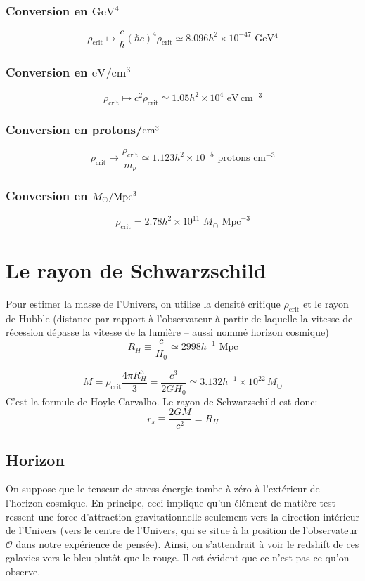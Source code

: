 \documentclass{article}
\numberwithin{equation}{section}
\begin{document}
\subsubsection{Conversion en $\si{\giga \electronvolt^{4}}$}
\[
        \rho_{\text{crit}} \mapsto \frac{c}{\hbar} (\hbar c)^4 \rho_{\text{crit}}
        \simeq 8.096 h^2 \times 10^{-47}\,\, \si{\giga\electronvolt^{4}}
\]

\subsubsection{Conversion en $\si{\electronvolt \per \centi\meter^{3}}$}
\[
        \rho_{\text{crit}} \mapsto c^2 \rho_{\text{crit}} \simeq 1.05 h^2 \times 10^{4}\,\, 
        \si{\electronvolt}\, \text{cm}^{-3}
\]

\subsubsection{Conversion en \textmd{protons}/$\textmd{cm}^{3}$}
\[
        \rho_{\text{crit}} \mapsto \frac{\rho_{\text{crit}}}{m_p} \simeq 
        1.123h^2\times 10^{-5}\,\, \text{protons}\,\,\text{cm}^{-3}
\]

\subsubsection{Conversion en $M_\odot / \textmd{Mpc}^{3}$}
\[
        \rho_{\text{crit}} = 2.78h^2 \times 10^{11}\,\, M_\odot\,\, \text{Mpc}^{-3}
\]


\section{Le rayon de Schwarzschild}
Pour estimer la masse de l'Univers, on utilise la densité critique $\rho_{\text{crit}}$ 
et le rayon de Hubble (distance par rapport à l'observateur à partir de laquelle 
la vitesse de récession dépasse la vitesse de la lumière -- aussi nommé horizon cosmique)
\[
        R_H \equiv \frac{c}{H_0} \simeq 2998h^{-1}\,\, \text{Mpc}
\]

\[
        M =  \rho_{\text{crit}} \frac{4 \pi R_H^{3}}{3} = \frac{c^3}{2GH_0} 
       \simeq 3.132  h^{-1} \times 10^{22}\, M_\odot
\]
C'est la formule de Hoyle-Carvalho.
Le rayon de Schwarzschild est donc:
\[
        r_s \equiv \frac{2 G M}{c^2} =  R_H
\]

\subsection{Horizon}
On suppose que le tenseur de stress-énergie tombe à zéro à l'extérieur de l'horizon cosmique.
En principe, ceci implique qu'un élément de matière test ressent une force d'attraction gravitationnelle 
seulement vers la direction intérieur de l'Univers (vers le centre de l'Univers, qui se situe à la 
position de l'observateur $\mathcal{O}$ dans notre expérience de pensée). Ainsi, on s'attendrait 
à voir le redshift de ces galaxies vers le bleu plutôt que le rouge. Il est évident que ce 
n'est pas ce qu'on observe.
\end{document}
